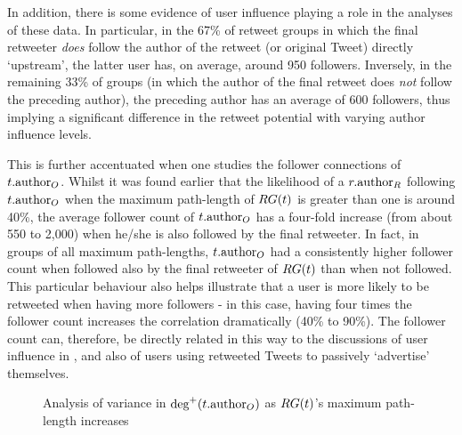 In addition, there is some evidence of user influence playing a role in the analyses of these data. In particular, in the 67\% of retweet groups in which the final retweeter \textit{does} follow the author of the retweet (or original Tweet) directly `upstream', the latter user has, on average, around 950 followers. Inversely, in the remaining 33\% of groups (in which the author of the final retweet does \textit{not} follow the preceding author), the preceding author has an average of 600 followers, thus implying a significant difference in the retweet potential with varying author influence levels.

This is further accentuated when one studies the follower connections of $t.\textrm{author}_O$. Whilst it was found earlier that the likelihood of a $r.\textrm{author}_R$ following $t.\textrm{author}_O$ when the maximum path-length of $RG(t)$ is greater than one is around 40\%, the average follower count of $t.\textrm{author}_O$ has a four-fold increase (from about 550 to 2,000) when he/she is also followed by the final retweeter. In fact, in groups of all maximum path-lengths, $t.\textrm{author}_O$ had a consistently higher follower count when followed also by the final retweeter of $RG(t)$ than when not followed.\\
This particular behaviour also helps illustrate that a user is more likely to be retweeted when having more followers - in this case, having four times the follower count increases the correlation dramatically (40\% to 90\%). The follower count can, therefore, be directly related in this way to the discussions of user influence in \cite{cha10}, and also of users using retweeted Tweets to passively `advertise' themselves.

\begin{figure}[h]
\centering
    \caption{Analysis of variance in $\textrm{deg}^+(t.\textrm{author}_O)$ as $RG(t)$'s maximum path-length increases}
\label{fig:originalfollowers-pathlength}
\end{figure}



